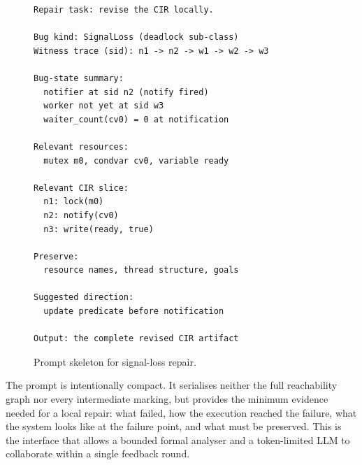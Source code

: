 \begin{figure}[t]
\begin{lstlisting}[basicstyle=\small\ttfamily,frame=single]
Repair task: revise the CIR locally.

Bug kind: SignalLoss (deadlock sub-class)
Witness trace (sid): n1 -> n2 -> w1 -> w2 -> w3

Bug-state summary:
  notifier at sid n2 (notify fired)
  worker not yet at sid w3
  waiter_count(cv0) = 0 at notification

Relevant resources:
  mutex m0, condvar cv0, variable ready

Relevant CIR slice:
  n1: lock(m0)
  n2: notify(cv0)
  n3: write(ready, true)

Preserve:
  resource names, thread structure, goals

Suggested direction:
  update predicate before notification

Output: the complete revised CIR artifact
\end{lstlisting}
\caption{Prompt skeleton for signal-loss repair.}
\label{fig:repair-prompt}
\end{figure}

The prompt is intentionally compact. It serialises neither the full
reachability graph nor every intermediate marking, but provides the
minimum evidence needed for a local repair: what failed, how the
execution reached the failure, what the system looks like at the
failure point, and what must be preserved. This is the interface that
allows a bounded formal analyser and a token-limited LLM to collaborate
within a single feedback round.
